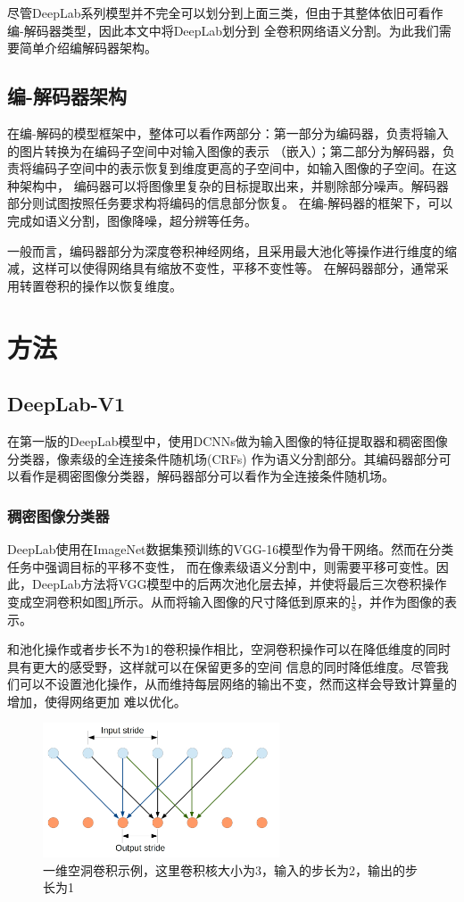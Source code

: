 \documentclass[10pt, a4paper]{article}
\begin{document}
尽管DeepLab系列模型并不完全可以划分到上面三类，但由于其整体依旧可看作编-解码器类型，因此本文中将DeepLab划分到
全卷积网络语义分割。为此我们需要简单介绍编解码器架构。

\subsection{编-解码器架构}
在编-解码的模型框架中，整体可以看作两部分：第一部分为编码器，负责将输入的图片转换为在编码子空间中对输入图像的表示
（嵌入）；第二部分为解码器，负责将编码子空间中的表示恢复到维度更高的子空间中，如输入图像的子空间。在这种架构中，
编码器可以将图像里复杂的目标提取出来，并剔除部分噪声。解码器部分则试图按照任务要求构将编码的信息部分恢复。
在编-解码器的框架下，可以完成如语义分割，图像降噪，超分辨等任务。

一般而言，编码器部分为深度卷积神经网络，且采用最大池化等操作进行维度的缩减，这样可以使得网络具有缩放不变性，平移不变性等。
在解码器部分，通常采用转置卷积的操作以恢复维度。

\section{方法}
\subsection{DeepLab-V1}
在第一版的DeepLab模型中，使用DCNNs做为输入图像的特征提取器和稠密图像分类器，像素级的全连接条件随机场(CRFs)\cite{CRF}
作为语义分割部分。其编码器部分可以看作是稠密图像分类器，解码器部分可以看作为全连接条件随机场。

\subsubsection{稠密图像分类器}
DeepLab使用在ImageNet数据集预训练的VGG-16模型\cite{VGG}作为骨干网络。然而在分类任务中强调目标的平移不变性，
而在像素级语义分割中，则需要平移可变性。因此，DeepLab方法将VGG模型中的后两次池化层去掉，并使将最后三次卷积操作
变成空洞卷积如图\ref{p2}所示。从而将输入图像的尺寸降低到原来的$\frac{1}{8}$，并作为图像的表示。

和池化操作或者步长不为1的卷积操作相比，空洞卷积操作可以在降低维度的同时具有更大的感受野，这样就可以在保留更多的空间
信息的同时降低维度。尽管我们可以不设置池化操作，从而维持每层网络的输出不变，然而这样会导致计算量的增加，使得网络更加
难以优化。

\begin{figure}[htbp]
    \centering
    \includegraphics[width=7cm]{imgs/p2.png}
    \caption{一维空洞卷积示例，这里卷积核大小为3，输入的步长为2，输出的步长为1}
    \label{p2}
\end{figure}
\end{document}
